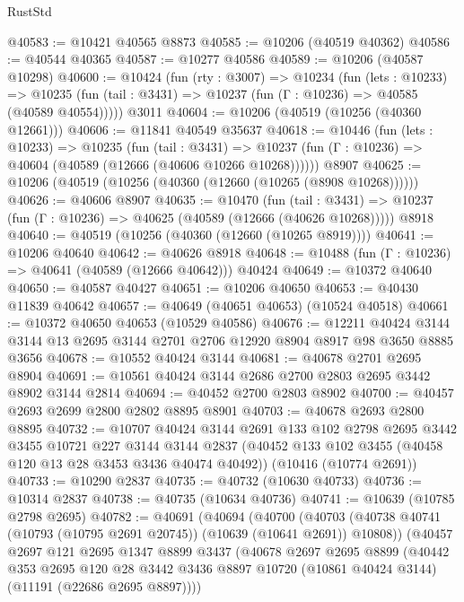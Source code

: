 \begin{lexlean}{RustStd}
\begin{coremodule}
@40583 := @10421 @40565 @8873
@40585 := @10206 (@40519 @40362)
@40586 := @40544 @40365
@40587 := @10277 @40586
@40589 := @10206 (@40587 @10298)
@40600 := @10424
    (fun (rty : @3007) =>
    @10234
      (fun (lets : @10233) =>
      @10235 (fun (tail : @3431) => @10237 (fun (Γ : @10236) => @40585 (@40589 @40554)))))
    @3011
@40604 := @10206 (@40519 (@10256 (@40360 @12661)))
@40606 := @11841 @40549 @35637
@40618 := @10446
    (fun (lets : @10233) =>
    @10235
      (fun (tail : @3431) =>
      @10237 (fun (Γ : @10236) => @40604 (@40589 (@12666 (@40606 @10266 @10268))))))
    @8907
@40625 := @10206 (@40519 (@10256 (@40360 (@12660 (@10265 (@8908 @10268))))))
@40626 := @40606 @8907
@40635 := @10470
    (fun (tail : @3431) => @10237 (fun (Γ : @10236) => @40625 (@40589 (@12666 (@40626 @10268)))))
    @8918
@40640 := @40519 (@10256 (@40360 (@12660 (@10265 @8919))))
@40641 := @10206 @40640
@40642 := @40626 @8918
@40648 := @10488 (fun (Γ : @10236) => @40641 (@40589 (@12666 @40642))) @40424
@40649 := @10372 @40640
@40650 := @40587 @40427
@40651 := @10206 @40650
@40653 := @40430 @11839 @40642
@40657 := @40649 (@40651 @40653) (@10524 @40518)
@40661 := @10372 @40650 @40653 (@10529 @40586)
@40676 := @12211
    @40424
    @3144
    @3144
    @13
    @2695
    @3144
    @2701
    @2706
    @12920
    @8904
    @8917
    @98
    @3650
    @8885
    @3656
@40678 := @10552 @40424 @3144
@40681 := @40678 @2701 @2695 @8904
@40691 := @10561 @40424 @3144 @2686 @2700 @2803 @2695 @3442 @8902 @3144 @2814
@40694 := @40452 @2700 @2803 @8902
@40700 := @40457 @2693 @2699 @2800 @2802 @8895 @8901
@40703 := @40678 @2693 @2800 @8895
@40732 := @10707
    @40424
    @3144
    @2691
    @133
    @102
    @2798
    @2695
    @3442
    @3455
    @10721
    @227
    @3144
    @3144
    @2837
    (@40452 @133 @102 @3455 (@40458 @120 @13 @28 @3453 @3436 @40474 @40492))
    (@10416 (@10774 @2691))
@40733 := @10290 @2837
@40735 := @40732 (@10630 @40733)
@40736 := @10314 @2837
@40738 := @40735 (@10634 @40736)
@40741 := @10639 (@10785 @2798 @2695)
@40782 := @40691
    (@40694
      (@40700
        (@40703 (@40738 @40741 (@10793 (@10795 @2691 @20745)) (@10639 (@10641 @2691)) @10808))
        (@40457
          @2697
          @121
          @2695
          @1347
          @8899
          @3437
          (@40678
            @2697
            @2695
            @8899
            (@40442
              @353
              @2695
              @120
              @28
              @3442
              @3436
              @8897
              @10720
              (@10861 @40424 @3144)
              (@11191 (@22686 @2695 @8897))))

\end{coremodule}
\end{lexlean}
